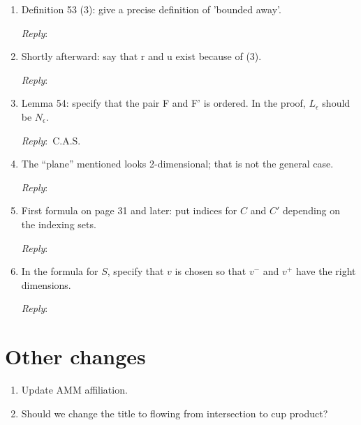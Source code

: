 \documentclass{amsart}
\newcommand{\ar}{\medskip\noindent\textit{Reply}:\ }
\newcommand{\tbw}{\ar \hrulefill}
\newcommand{\cas}{\ar C.A.S.}
\begin{document}
\begin{enumerate}
		\tbw

		\item Definition 53 (3): give a precise definition of 'bounded away'.

		\tbw

		\item Shortly afterward: say that r and u exist because of (3).

		\tbw

		\item Lemma 54: specify that the pair F and F' is ordered. In the proof, $L_\epsilon$ should be $N_\epsilon$.

		\cas

		\item The “plane” mentioned looks 2-dimensional; that is not the general case.

		\tbw

		\item First formula on page 31 and later: put indices for $C$ and $C'$ depending on the indexing sets.

		\tbw

		\item In the formula for $S$, specify that $v$ is chosen so that $v^-$ and $v^+$ have the right dimensions.

		\tbw
	\end{enumerate}

	\section{Other changes}

	\begin{enumerate}
		\item Update AMM affiliation.

		\item Should we change the title to flowing from intersection to cup product?
	\end{enumerate}
\end{document}
